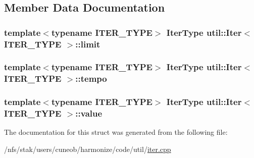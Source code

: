 \subsection{Member Data Documentation}
\hypertarget{structutil_1_1Iter_adbc6052a7353abb1e4c199b691cd9170}{
\subsubsection[{limit}]{\setlength{\rightskip}{0pt plus 5cm}template$<$typename I\-T\-E\-R\-\_\-\-T\-Y\-P\-E$>$ {\bf Iter\-Type} {\bf util\-::\-Iter}$<$ I\-T\-E\-R\-\_\-\-T\-Y\-P\-E $>$\-::limit}}\label{structutil_1_1Iter_adbc6052a7353abb1e4c199b691cd9170}
\hypertarget{structutil_1_1Iter_a19fa35c05914484d2330667c5d9f26e4}{
\subsubsection[{tempo}]{\setlength{\rightskip}{0pt plus 5cm}template$<$typename I\-T\-E\-R\-\_\-\-T\-Y\-P\-E$>$ {\bf Iter\-Type} {\bf util\-::\-Iter}$<$ I\-T\-E\-R\-\_\-\-T\-Y\-P\-E $>$\-::tempo}}\label{structutil_1_1Iter_a19fa35c05914484d2330667c5d9f26e4}
\hypertarget{structutil_1_1Iter_ac926295bb2bf847130bccf974259a8e6}{
\subsubsection[{value}]{\setlength{\rightskip}{0pt plus 5cm}template$<$typename I\-T\-E\-R\-\_\-\-T\-Y\-P\-E$>$ {\bf Iter\-Type} {\bf util\-::\-Iter}$<$ I\-T\-E\-R\-\_\-\-T\-Y\-P\-E $>$\-::value}}\label{structutil_1_1Iter_ac926295bb2bf847130bccf974259a8e6}


The documentation for this struct was generated from the following file\-:\begin{DoxyCompactItemize}
\item 
/nfs/stak/users/cuneob/harmonize/code/util/\hyperlink{iter_8cpp}{iter.\-cpp}\end{DoxyCompactItemize}
